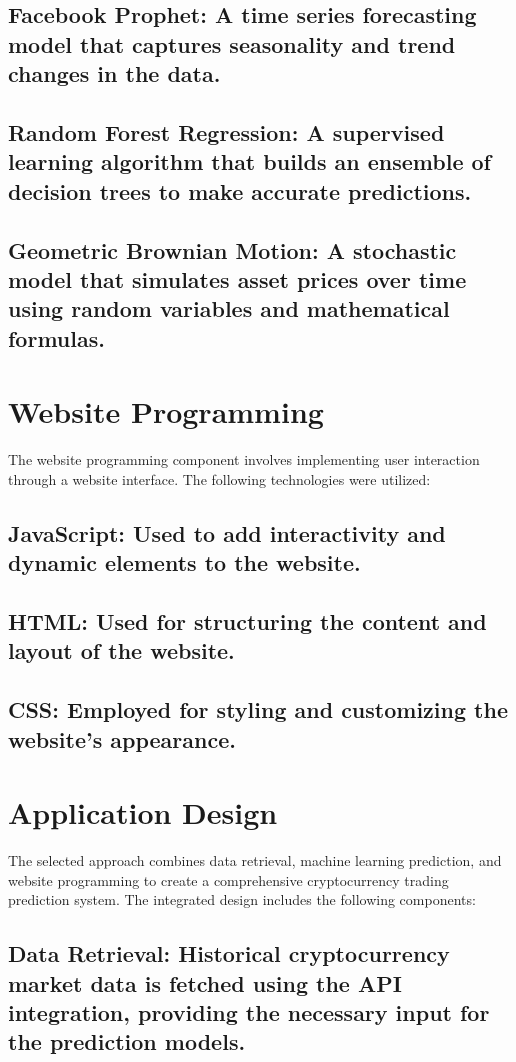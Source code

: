 \subsection{Facebook Prophet: A time series forecasting model that captures seasonality and trend changes in the data.}
\subsection{Random Forest Regression: A supervised learning algorithm that builds an ensemble of decision trees to make accurate predictions.}
\subsection{Geometric Brownian Motion: A stochastic model that simulates asset prices over time using random variables and mathematical formulas.}

\section{Website Programming}
The website programming component involves implementing user interaction through a website interface. The following technologies were utilized:
\subsection{JavaScript: Used to add interactivity and dynamic elements to the website.}
\subsection{HTML: Used for structuring the content and layout of the website.}
\subsection{CSS: Employed for styling and customizing the website's appearance.}

\section{Application Design}
The selected approach combines data retrieval, machine learning prediction, and website programming to create a comprehensive cryptocurrency trading prediction system. The integrated design includes the following components:
\subsection{Data Retrieval: Historical cryptocurrency market data is fetched using the API integration, providing the necessary input for the prediction models.}
